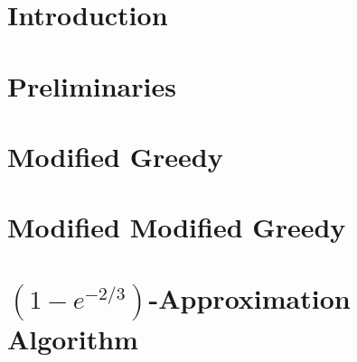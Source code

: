 \newcommand\todo[1]{\textcolor{red}{TODO #1}\newline}


\section{Introduction}

\section{Preliminaries}

\section{Modified Greedy}

\section{Modified Modified Greedy}

\section{\texorpdfstring{$(1 - e^{-2/3})$}{(1 - e\^-2/3)}-Approximation Algorithm}
